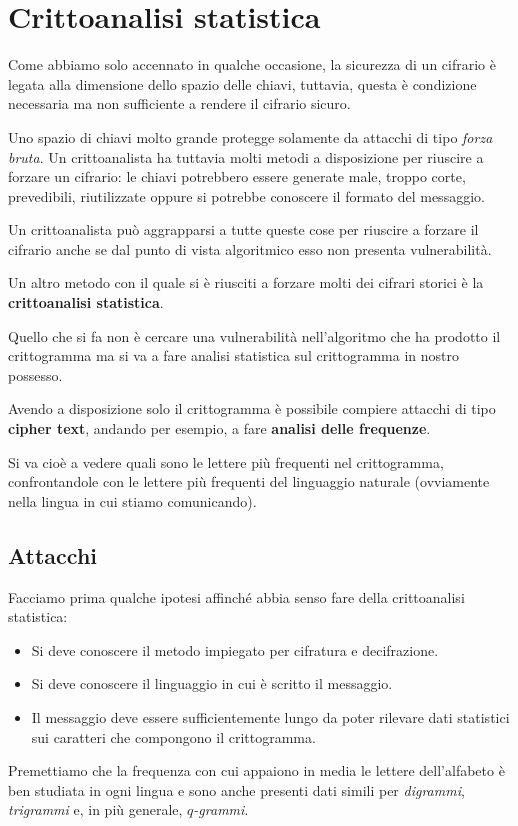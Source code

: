 \section{Crittoanalisi statistica}\label{crittoanalisi_statistica}
Come abbiamo solo accennato in qualche occasione, la sicurezza di un cifrario \`e legata alla dimensione dello spazio
delle chiavi, tuttavia, questa \`e condizione necessaria ma non sufficiente a rendere il cifrario sicuro.

Uno spazio di chiavi molto grande protegge solamente da attacchi di tipo \emph{forza bruta}. Un crittoanalista ha
tuttavia molti metodi a disposizione per riuscire a forzare un cifrario: le chiavi potrebbero essere generate male,
troppo corte, prevedibili, riutilizzate oppure si potrebbe conoscere il formato del messaggio.

Un crittoanalista pu\`o aggrapparsi a tutte queste cose per riuscire a forzare il cifrario anche se dal punto di vista
algoritmico esso non presenta vulnerabilit\`a.

Un altro metodo con il quale si \`e riusciti a forzare molti dei cifrari storici \`e la \textbf{crittoanalisi statistica}.

Quello che si fa non \`e cercare una vulnerabilit\`a nell'algoritmo che ha prodotto il crittogramma ma si va a fare
analisi statistica sul crittogramma in nostro possesso.

Avendo a disposizione solo il crittogramma \`e possibile compiere attacchi di tipo \textbf{cipher text}, andando per
esempio, a fare \textbf{analisi delle frequenze}.

Si va cio\`e a vedere quali sono le lettere pi\`u frequenti nel crittogramma, confrontandole con le lettere pi\`u
frequenti del linguaggio naturale (ovviamente nella lingua in cui stiamo comunicando).

\subsection{Attacchi}
Facciamo prima qualche ipotesi affinch\'e abbia senso fare della crittoanalisi statistica:
\begin{itemize}
	\item Si deve conoscere il metodo impiegato per cifratura e decifrazione.
	\item Si deve conoscere il linguaggio in cui \`e scritto il messaggio.
	\item Il messaggio deve essere sufficientemente lungo da poter rilevare dati statistici sui caratteri che
	      compongono il crittogramma.
\end{itemize}
Premettiamo che la frequenza con cui appaiono in media le lettere dell'alfabeto \`e ben studiata in ogni lingua e sono
anche presenti dati simili per \emph{digrammi}, \emph{trigrammi} e, in pi\`u generale, $q$\emph{-grammi}.

